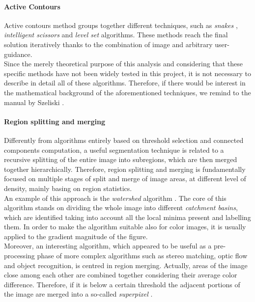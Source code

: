 \paragraph*{Active Contours}

Active contours \cite{balke1998active} method groups together different techniques, such as \textit{snakes} \cite{kass1988snakes}, \textit{intelligent scissors} \cite{mortensen1995intelligent} and \textit{level set} algorithms.
These methods reach the final solution iteratively thanks to the combination of image and arbitrary user-guidance.\\
Since the merely theoretical purpose of this analysis and considering that these specific methods have not been widely tested in this project, it is not necessary to describe in detail all of these algorithms.
Therefore, if there would be interest in the mathematical background of the aforementioned techniques, we remind to the manual by Szeliski \cite{Szeliski2011}.\\

\paragraph*{Region splitting and merging}

Differently from algorithms entirely based on threshold selection and connected components computation, a useful segmentation technique is related to a recursive splitting of the entire image into subregions, which are then merged together hierarchically. 
Therefore, region splitting and merging is fundamentally focused on multiple stages of split and merge of image areas, at different level of density, mainly basing on region statistics. \\
An example of this approach is the \textit{watershed} algorithm \cite{vincent1991watersheds}.
The core of this algorithm stands on dividing the whole image into different \textit{catchment basins}, which are identified taking into account all the local minima present and labelling them. 
In order to make the algorithm suitable also for color images, it is usually applied to the gradient magnitude of the figure. \\
Moreover, an interesting algorithm, which appeared to be useful as a pre-processing phase of more complex algorithms such as stereo matching, optic flow and object recognition, is centred in region merging.
Actually, areas of the image close among each other are combined together considering their average color difference. 
Therefore, if it is below a certain threshold the adjacent portions of the image are merged into a so-called \textit{superpixel} \cite{mori2004recovering}.  \\

